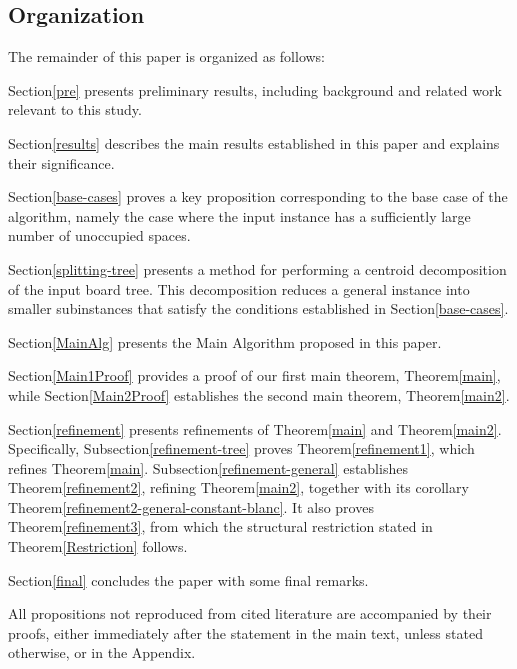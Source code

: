\documentclass[letter,11pt]{article}
\theoremstyle{definition}
\theoremstyle{definition}
\newcommand{\1}{\boldmath$~1~$\unboldmath}
\newcommand{\tume}{\hspace*{0.2em}}
\begin{document}
\subsection{Organization}

The remainder of this paper is organized as follows:

Section\tume\ref{pre} presents preliminary results, including background and related work relevant to this study.  

Section\tume\ref{results} describes the main results established in this paper and explains their significance.

Section\tume\ref{base-cases} proves a key proposition corresponding to the base case of the algorithm, namely the case where the input instance has a sufficiently large number of unoccupied spaces.

Section\tume\ref{splitting-tree} presents a method for performing a centroid decomposition of the input board tree.
This decomposition reduces a general instance into smaller subinstances that satisfy the conditions established in Section\tume\ref{base-cases}.

Section\tume\ref{MainAlg} presents the Main Algorithm proposed in this paper.

Section\tume\ref{Main1Proof} provides a proof of our first main theorem, Theorem\tume\ref{main}, 
while Section\tume\ref{Main2Proof} establishes the second main theorem, Theorem\tume\ref{main2}.

Section\tume\ref{refinement} presents refinements of 
Theorem\tume\ref{main} and Theorem\tume\ref{main2}.
Specifically, Subsection\tume\ref{refinement-tree}
proves Theorem\tume\ref{refinement1}, which refines
Theorem\tume\ref{main}. 
Subsection\tume\ref{refinement-general}
establishes Theorem\tume\ref{refinement2},
refining Theorem\tume\ref{main2}, together with its
corollary Theorem\tume\ref{refinement2-general-constant-blanc}.
It also proves Theorem\tume\ref{refinement3}, from which
the structural restriction stated in
Theorem\tume\ref{Restriction} follows.


Section\tume\ref{final} concludes the paper with some final remarks.

All propositions not reproduced from cited literature are accompanied by their proofs, 
either immediately after the statement in the main text, unless stated otherwise, or in the Appendix.
\end{document}
